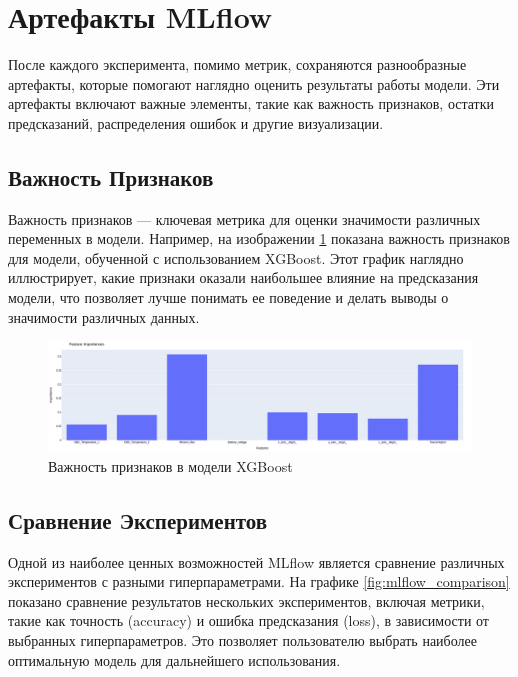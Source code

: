 \documentclass[14pt, a4paper]{bsu}
\begin{document}
\section{Артефакты MLflow}

После каждого эксперимента, помимо метрик, сохраняются
разнообразные артефакты, которые помогают наглядно оценить
результаты работы модели. Эти артефакты включают важные элементы,
такие как важность признаков, остатки предсказаний, распределения
ошибок и другие визуализации.

\subsection{Важность Признаков}

Важность признаков — ключевая метрика для оценки значимости
различных переменных в модели. Например, на изображении
\ref{fig:feature_importances} показана важность признаков для
модели, обученной с использованием XGBoost. Этот график наглядно
иллюстрирует, какие признаки оказали наибольшее влияние на
предсказания модели, что позволяет лучше понимать ее поведение и
делать выводы о значимости различных данных.

\begin{figure}[h!] \centering
	\includegraphics[width=1.0\textwidth]{feature_importances_example.png}
	\caption{Важность признаков в модели XGBoost}
	\label{fig:feature_importances} \end{figure}

\subsection{Сравнение Экспериментов}

Одной из наиболее ценных возможностей MLflow является сравнение
различных экспериментов с разными гиперпараметрами. На графике
\ref{fig:mlflow_comparison} показано сравнение результатов
нескольких экспериментов, включая метрики, такие как точность
(accuracy) и ошибка предсказания (loss), в зависимости от выбранных
гиперпараметров. Это позволяет пользователю выбрать наиболее
оптимальную модель для дальнейшего использования.
\end{document}
